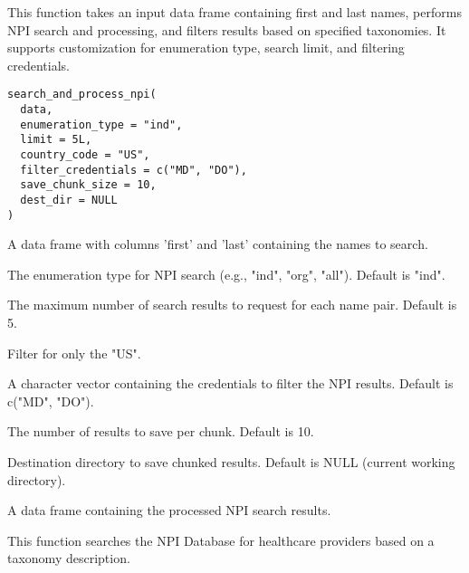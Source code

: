 \documentclass[a4paper]{book}
\begin{document}
%
\begin{Description}
This function takes an input data frame containing first and last names, performs NPI search and processing,
and filters results based on specified taxonomies. It supports customization for enumeration type, search limit,
and filtering credentials.
\end{Description}
%
\begin{Usage}
\begin{verbatim}
search_and_process_npi(
  data,
  enumeration_type = "ind",
  limit = 5L,
  country_code = "US",
  filter_credentials = c("MD", "DO"),
  save_chunk_size = 10,
  dest_dir = NULL
)
\end{verbatim}
\end{Usage}
%
\begin{Arguments}
\begin{ldescription}
\item[\code{data}] A data frame with columns 'first' and 'last' containing the names to search.

\item[\code{enumeration\_type}] The enumeration type for NPI search (e.g., "ind", "org", "all"). Default is "ind".

\item[\code{limit}] The maximum number of search results to request for each name pair. Default is 5.

\item[\code{country\_code}] Filter for only the "US".

\item[\code{filter\_credentials}] A character vector containing the credentials to filter the NPI results. Default is c("MD", "DO").

\item[\code{save\_chunk\_size}] The number of results to save per chunk. Default is 10.

\item[\code{dest\_dir}] Destination directory to save chunked results. Default is NULL (current working directory).
\end{ldescription}
\end{Arguments}
%
\begin{Value}
A data frame containing the processed NPI search results.
\end{Value}
%
\begin{Description}
This function searches the NPI Database for healthcare providers based on a taxonomy description.
\end{Description}
\end{document}
